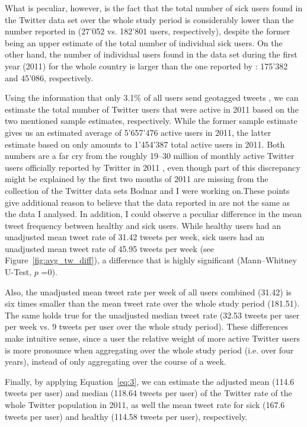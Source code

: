\documentclass[11pt, a4paper,twoside]{report}\usepackage[]{graphicx}\usepackage[]{color}
\begin{document}
What is peculiar, however, is the fact that the total number of sick users found in the Twitter data set over the whole study period is considerably lower than the number reported in \cite{bodnar_data_2015} (27'052 vs. 182'801 users, respectively), despite the former being an upper estimate of the total number of individual sick users. On the other hand, the number of individual users found in the data set during the first year (2011) for the whole country is larger than the one reported by \cite{bodnar_data_2015}: 175'382 and 45'086, respectively.

Using the information that only 3.1\% of all users send geotagged tweets \citep{sloan2013knowing}, we can estimate the total number of Twitter users that were active in 2011 based on the two mentioned sample estimates, respectively. While the former sample estimate gives us an estimated average of 5'657'476 active users in 2011, the latter estimate based on \cite{bodnar_data_2015} only amounts to 1'454'387 total active users in 2011. Both numbers are a far cry from the roughly 19--30 million of monthly active Twitter users officially reported by Twitter in 2011 \citep{twitter_annual_2013}, even though part of this discrepancy might be explained by the first two months of 2011 are missing from the collection of the Twitter data sets Bodnar and I were working on.These points give additional reason to believe that the data reported in \cite{bodnar_data_2015} are not the same as the data I analysed. In addition, I could observe a peculiar difference in the mean tweet frequency between healthy and sick users. While healthy users had an unadjusted mean tweet rate of 31.42 tweets per week, sick users had an unadjusted mean tweet rate of 45.95 tweets per week (see Figure~\ref{fig:avg_tw_diff}), a difference that is highly significant (Mann--Whitney U-Test, $p$ =0). 

Also, the unadjusted mean tweet rate per week of all users combined (31.42) is six times smaller than the mean tweet rate over the whole study period (181.51). The same holds true for the unadjusted median tweet rate (32.53 tweets per user per week vs. 9 tweets per user over the whole study period). These differences make intuitive sense, since a user the relative weight of more active Twitter users is more pronounce when aggregating over the whole study period (i.e. over four years), instead of only aggregating over the course of a week.

Finally, by applying Equation~\ref{eq:3}, we can estimate the adjusted mean (114.6 tweets per user) and median (118.64 tweets per user) of the Twitter rate of the whole Twitter population in 2011, as well the mean tweet rate for sick (167.6 tweets per user) and healthy (114.58 tweets per user), respectively.
\end{document}
